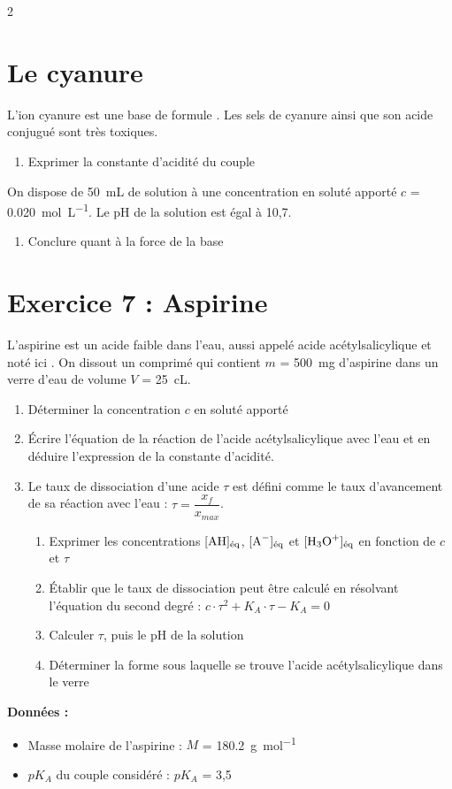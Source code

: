 \documentclass[a4paper,11pt,fleqn]{article}%
\begin{document}
\begin{multicols}{2}
\section{Le cyanure}
L'ion cyanure est une base de formule . Les sels de cyanure ainsi que son acide conjugué sont très toxiques.
\begin{enumerate}
	\item Exprimer la constante d'acidité du couple
\end{enumerate}
On dispose de \SI{50}{\milli \liter} de solution à une concentration en soluté apporté $c$ = \SI{0,020}{\mole \per \liter}. Le pH de la solution est égal à 10,7.
\begin{enumerate}[resume]
	\item Conclure quant à la force de la base
\end{enumerate}

\section*{Exercice 7 : Aspirine}
L'aspirine est un acide faible dans l'eau, aussi appelé acide acétylsalicylique et noté ici . On dissout un comprimé qui contient $m$ = \SI{500}{\milli \gram} d'aspirine dans un verre d'eau de volume $V$ = \SI{25}{\centi \liter}.
\begin{enumerate}
	\item Déterminer la concentration $c$ en soluté apporté
	\item Écrire l'équation de la réaction de l'acide acétylsalicylique avec l'eau et en déduire l'expression de la constante d'acidité.
	\item Le taux de dissociation d'une acide $\tau$ est défini comme le taux d'avancement de sa réaction avec l'eau : $\tau = \dfrac{x_f}{x_{max}}$.
	\begin{enumerate}
		\item Exprimer les concentrations $[\ce{AH}]_{\text{éq}}$, $[\ce{A-}]_{\text{éq}}$ et $[\ce{H3O+}]_{\text{éq}}$ en fonction de $c$ et $\tau$
		\item Établir que le taux de dissociation peut être calculé en résolvant l'équation du second degré : $c \cdot \tau^2 + K_A \cdot \tau - K_A = 0$
		\item Calculer $\tau$, puis le pH de la solution
		\item Déterminer la forme sous laquelle se trouve l'acide acétylsalicylique dans le verre
	\end{enumerate}
\end{enumerate}
\textbf{Données :}
\begin{itemize}
	\item Masse molaire de l'aspirine : $M$ = \SI{180,2}{\gram \per \mole}
	\item $pK_A$ du couple considéré : $pK_A$ = 3,5 
\end{itemize}


\end{multicols}
\end{document}
